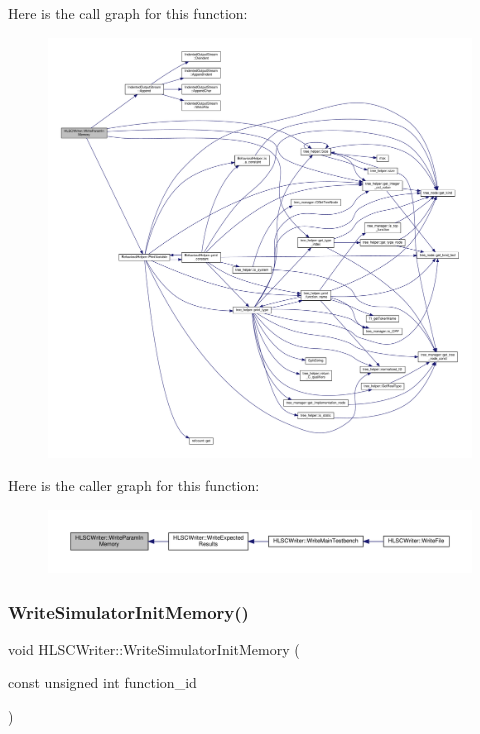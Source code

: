 Here is the call graph for this function\+:
\nopagebreak
\begin{figure}[H]
\begin{center}
\leavevmode
\includegraphics[width=350pt]{d4/db1/classHLSCWriter_a878ff97c2a1428574b641d4ef2704b76_cgraph}
\end{center}
\end{figure}
Here is the caller graph for this function\+:
\nopagebreak
\begin{figure}[H]
\begin{center}
\leavevmode
\includegraphics[width=350pt]{d4/db1/classHLSCWriter_a878ff97c2a1428574b641d4ef2704b76_icgraph}
\end{center}
\end{figure}
\mbox{\label{classHLSCWriter_ae0fce69eece5d49b74c5d615f169f17b}} 
\subsubsection{\texorpdfstring{Write\+Simulator\+Init\+Memory()}{WriteSimulatorInitMemory()}}
{\footnotesize\ttfamily void H\+L\+S\+C\+Writer\+::\+Write\+Simulator\+Init\+Memory (\begin{DoxyParamCaption}\item[{const unsigned int}]{function\+\_\+id }\end{DoxyParamCaption})\hspace{0.3cm}{\ttfamily [protected]}}



